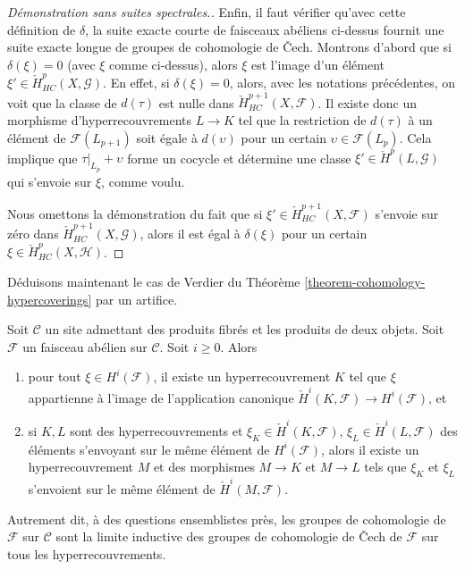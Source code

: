 \begin{proof}[Démonstration sans suites spectrales.]
\medskip\noindent
Enfin, il faut vérifier qu'avec cette définition de $\delta$,
la suite exacte courte de faisceaux abéliens ci-dessus fournit une
suite exacte longue de groupes de cohomologie de {\v C}ech.
Montrons d'abord que si $\delta(\xi) = 0$ (avec $\xi$ comme ci-dessus), alors
$\xi$ est l'image d'un élément
$\xi' \in \check{H}^p_{HC}(X, \mathcal{G})$.
En effet, si $\delta(\xi) = 0$, alors, avec les notations précédentes, on
voit que la classe de $d(\tau)$ est nulle dans
$\check{H}^{p + 1}_{HC}(X, \mathcal{F})$. Il existe donc
un morphisme d'hyperrecouvrements $L \to K$ tel que la restriction
de $d(\tau)$ à un élément de $\mathcal{F}(L_{p + 1})$ soit
égale à $d(\upsilon)$ pour un certain $\upsilon \in \mathcal{F}(L_p)$.
Cela implique que $\tau|_{L_p} + \upsilon$ forme un
cocycle et détermine une classe $\xi' \in \check{H}^p(L, \mathcal{G})$
qui s'envoie sur $\xi$, comme voulu.

\medskip\noindent
Nous omettons la démonstration du fait que si $\xi' \in \check{H}^{p + 1}_{HC}(X, \mathcal{F})$
s'envoie sur zéro dans $\check{H}^{p + 1}_{HC}(X, \mathcal{G})$, alors il est
égal à $\delta(\xi)$ pour un certain $\xi \in \check{H}^p_{HC}(X, \mathcal{H})$.
\end{proof}

\noindent
Déduisons maintenant le cas de Verdier du
Théorème \ref{theorem-cohomology-hypercoverings}
par un artifice.

\begin{proposition}
\label{proposition-cohomology-hypercoverings}
Soit $\mathcal{C}$ un site admettant des produits fibrés et les produits de deux objets.
Soit $\mathcal{F}$ un faisceau abélien sur $\mathcal{C}$.
Soit $i \geq 0$. Alors
\begin{enumerate}
\item pour tout $\xi \in H^i(\mathcal{F})$, il existe un hyperrecouvrement
$K$ tel que $\xi$ appartienne à l'image de l'application canonique
$\check{H}^i(K, \mathcal{F}) \to H^i(\mathcal{F})$, et
\item si $K, L$ sont des hyperrecouvrements et $\xi_K \in \check{H}^i(K, \mathcal{F})$,
$\xi_L \in \check{H}^i(L, \mathcal{F})$ des éléments s'envoyant
sur le même élément de $H^i(\mathcal{F})$, alors il existe
un hyperrecouvrement $M$ et des morphismes $M \to K$ et $M \to L$ tels
que $\xi_K$ et $\xi_L$ s'envoient sur le même élément de
$\check{H}^i(M, \mathcal{F})$.
\end{enumerate}
Autrement dit, à des questions ensemblistes près, les groupes de
cohomologie de $\mathcal{F}$ sur $\mathcal{C}$ sont la limite inductive des
groupes de cohomologie de {\v C}ech de $\mathcal{F}$ sur tous les hyperrecouvrements.
\end{proposition}

